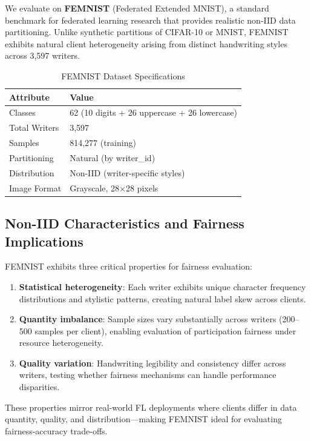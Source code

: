 \documentclass{article}
\begin{document}
We evaluate on \textbf{FEMNIST} (Federated Extended MNIST), a standard benchmark for federated learning research that provides realistic non-IID data partitioning. Unlike synthetic partitions of CIFAR-10 or MNIST, FEMNIST exhibits natural client heterogeneity arising from distinct handwriting styles across 3,597 writers.

\begin{table}[t]
\centering
\begin{tabular}{@{}ll@{}}
\toprule
\textbf{Attribute} & \textbf{Value} \\
\midrule
Classes & 62 (10 digits + 26 uppercase + 26 lowercase) \\
Total Writers & 3,597 \\
Samples & 814,277 (training) \\
Partitioning & Natural (by writer\_id) \\
Distribution & Non-IID (writer-specific styles) \\
Image Format & Grayscale, 28×28 pixels \\
\bottomrule
\end{tabular}
\caption{FEMNIST Dataset Specifications}
\label{tab:femnist}
\end{table}

\subsection{Non-IID Characteristics and Fairness Implications}

FEMNIST exhibits three critical properties for fairness evaluation:
\begin{enumerate}
\item \textbf{Statistical heterogeneity}: Each writer exhibits unique character frequency distributions and stylistic patterns, creating natural label skew across clients.
\item \textbf{Quantity imbalance}: Sample sizes vary substantially across writers (200--500 samples per client), enabling evaluation of participation fairness under resource heterogeneity.
\item \textbf{Quality variation}: Handwriting legibility and consistency differ across writers, testing whether fairness mechanisms can handle performance disparities.
\end{enumerate}

These properties mirror real-world FL deployments where clients differ in data quantity, quality, and distribution—making FEMNIST ideal for evaluating fairness-accuracy trade-offs.
\end{document}
